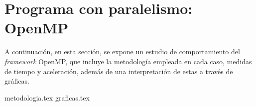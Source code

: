 \part{Programa con paralelismo: OpenMP}

A continuación, en esta sección, se expone un estudio de comportamiento del \textit{framework} OpenMP, que incluye la metodología empleada en cada caso, medidas de tiempo y aceleración, además de una interpretación de estas a través de gráficas. 

{metodologia.tex}
\newpage
{graficas.tex}
